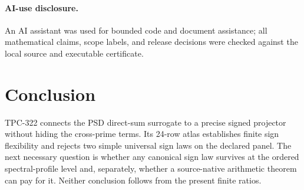 \documentclass[10pt]{article}
\begin{document}
\paragraph{AI-use disclosure.} An AI assistant was used for bounded code and
document assistance; all mathematical claims, scope labels, and release
decisions were checked against the local source and executable certificate.

\section{Conclusion}

TPC-322 connects the PSD direct-sum surrogate to a precise signed projector
without hiding the cross-prime terms.  Its 24-row atlas establishes finite
sign flexibility and rejects two simple universal sign laws on the declared
panel.  The next necessary question is whether any canonical sign law
survives at the ordered spectral-profile level and, separately, whether a
source-native arithmetic theorem can pay for it.  Neither conclusion follows
from the present finite ratios.
\end{document}
